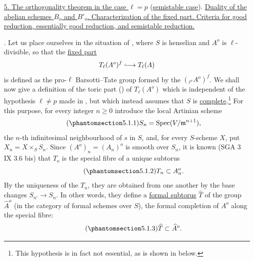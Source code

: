 
\medskip
\noindent
\underline{5. The orthogonality theorem in the case $\ell=p$}
(\underline{semistable case}).  \underline{Duality of the abelian schemes $B_o$ and $B'_o$.
Characterization of the fixed part.  Criteria for good reduction,
essentially good reduction, and semistable reduction.}

\medskip
\noindent
{}. Let us place ourselves in the situation of , where $S$ is
henselian and $A^o$ is $\ell$-divisible, so that the \underline{fixed
part}
\[
 T_\ell(A^o)^f\lhook\joinrel\longrightarrow T_\ell(A)
\]
is defined as the pro-$\ell$ Barsotti--Tate group formed by the
$({}_{\ell^\nu}A^o)^f$.  We shall now give a definition of the toric
part () of $T_\ell(A^o)$ which is independent of the hypothesis
$\ell\neq p$ made in , but which instead assumes that $S$ is
\underline{complete}.\footnote{This hypothesis is in fact not
essential, as is shown in  below.}  For this purpose, for every
integer $n\geq0$ introduce the local Artinian scheme
\begin{equation}\tag{\SGARefTarget{sga7.sga7i.eix.n5-1-1}{5.1.1}}
 S_n=\operatorname{Spec}(V/\mathfrak m^{n+1}),
\end{equation}
the $n$-th infinitesimal neighbourhood of $s$ in $S$, and, for every
$S$-scheme $X$, put $X_n=X\times_S S_n$.  Since
$(A^o)_n=(A_n)^o$ is smooth over $S_n$, it is known (SGA 3 IX 3.6 bis)
that $T_o$ is the special fibre of a unique subtorus
\begin{equation}\tag{\SGARefTarget{sga7.sga7i.eix.n5-1-2}{5.1.2}}
 T_n\subset A_n^o.
\end{equation}
By the uniqueness of the $T_n$, they are obtained from one another by
the base changes $S_{n'}\longrightarrow S_n$.  In other words, they
define a \underline{formal subtorus} $\widehat T$ of the group
$\widehat A^o$ (in the category of formal schemes over $S$), the formal
completion of $A^o$ along the special fibre:
\begin{equation}\tag{\SGARefTarget{sga7.sga7i.eix.n5-1-3}{5.1.3}}
 \widehat T\subset\widehat A^o.
\end{equation}

